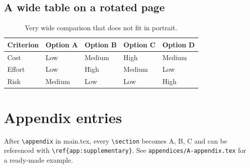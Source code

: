 \documentclass[10pt, a4paper]{article}
\begin{document}
\begin{landscape}
\subsection{A wide table on a rotated page}

\begin{table}[H]
    \centering
    \caption{Very wide comparison that does not fit in portrait.}
    \label{tab:cookbook-landscape}
    \begin{tabularx}{\linewidth}{lXXXX}
        \toprule
        \textbf{Criterion} & \textbf{Option A} & \textbf{Option B} & \textbf{Option C} & \textbf{Option D} \\
        \midrule
        Cost               & Low               & Medium            & High              & Medium            \\
        Effort             & Low               & High              & Medium            & Low               \\
        Risk               & Medium            & Low               & Low               & High              \\
        \bottomrule
    \end{tabularx}
\end{table}
\end{landscape}

\section{Appendix entries}

After \verb|\appendix| in main.tex, every \verb|\section| becomes A, B, C and
can be referenced with \verb|\ref{app:supplementary}|. See
\verb|appendices/A-appendix.tex| for a ready-made example.
\end{document}
